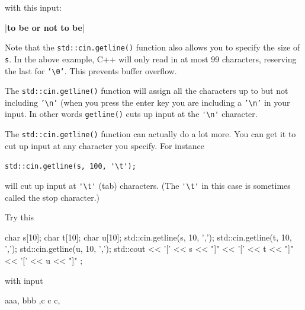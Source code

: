 with this input:

\begin{consolethree}[escapeinside=||]
|\textbf{to be or not to be}|
\end{consolethree}

Note that the \texttt{std::cin.getline()} function also allows you to specify the size of \texttt{s}. In the above example, C++ will only read in at most 99 characters, reserving the last for \texttt{'\textbackslash 0'}. This prevents buffer overflow.

The \texttt{std::cin.getline()} function will assign all the characters up to but not including \texttt{'\textbackslash n'} (when you press the enter key you are including a \texttt{'\textbackslash n'} in your input. In other words \verb!getline()! cuts up input at the \verb!'\n'! character.

The \texttt{std::cin.getline()} function can actually do a lot more. You can get it to cut up input at any character you specify. For instance

\begin{center}
\verb!std::cin.getline(s, 100, '\t');!
\end{center}

will cut up input at \verb!'\t'! (tab) characters. (The \verb!'\t'! in this case is sometimes called the stop character.)

Try this

\begin{consolethree}[escapeinside=||]
char s[10];
char t[10];
char u[10];
std::cin.getline(s, 10, ',');
std::cin.getline(t, 10, ',');
std::cin.getline(u, 10, ',');
std::cout << '[' << s << "]\n"
          << '[' << t << "]\n"
          << '[' << u << "]\n" ;
\end{consolethree}

with input

\begin{console}
aaa, bbb ,c c c,
\end{console}



